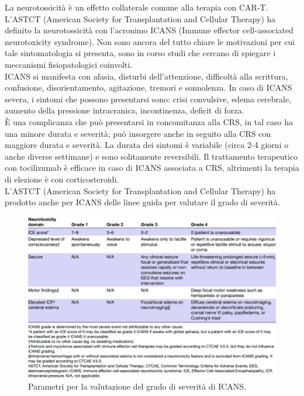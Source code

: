 La neurotossicità è un effetto collaterale comune alla terapia con CAR-T. 
L’ASTCT (American Society for Transplantation and Cellular Therapy) ha definito la neurotossicità con 
l’acronimo ICANS (Immune effector cell-associated neurotoxicity syndrome). Non sono ancora del tutto chiare le 
motivazioni per cui tale sintomatologia si presenta, sono in corso studi che cercano di spiegare i meccanismi 
fisiopatologici coinvolti\cite{EMATOCART}.\\
ICANS si manifesta con afasia, disturbi dell’attenzione, difficoltà alla scrittura, confusione, disorientamento, 
agitazione, tremori e sonnolenza. In caso di ICANS severa, i sintomi che possono presentarsi sono: crisi convulsive, 
edema cerebrale, aumento della pressione intracranica, incontinenza, deficit di forza\cite{EMATOCART}.\\
È una complicanza che può presentarsi in concomitanza alla CRS, in tal caso ha una minore durata e severità; 
può insorgere anche in seguito alla CRS con maggiore durata e severità. La durata dei sintomi è variabile 
(circa 2-4 giorni o anche diverse settimane) e sono solitamente reversibili. 
Il trattamento terapeutico con tocilizumab è efficace in caso di ICANS associata a CRS, altrimenti la terapia di 
elezione è con corticosteroidi\cite{EMATOCART}.\\
L’ASTCT (American Society for Transplantation and Cellular Therapy) 
ha prodotto anche per ICANS delle linee guida per valutare il grado di severità\cite{LEE2019625}.

\begin{figure}[H]
    \begin{center}
    \vspace{-3mm}
    \includegraphics[width=0.8\columnwidth]{img/ICANS.png}
    \end{center}
    \caption{Parametri per la valutazione del grado di severità di ICANS.
    \cite{ICANS}}

\end{figure}

